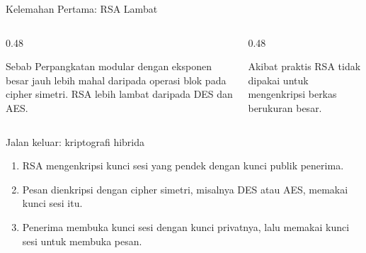 \documentclass[aspectratio=169,11pt]{beamer}
\begin{document}
\begin{frame}{Kelemahan Pertama: RSA Lambat}
    \footnotesize
    \begin{columns}[T,onlytextwidth]
        \begin{column}{0.48\textwidth}
            \begin{alertblock}{Sebab}
                Perpangkatan modular dengan eksponen besar jauh lebih mahal
                daripada operasi blok pada cipher simetri. RSA lebih lambat
                daripada DES dan AES.
            \end{alertblock}
        \end{column}
        \begin{column}{0.48\textwidth}
            \begin{exampleblock}{Akibat praktis}
                RSA tidak dipakai untuk mengenkripsi berkas berukuran
                besar.
            \end{exampleblock}
        \end{column}
    \end{columns}
    \vspace{0.15cm}
    \begin{block}{Jalan keluar: kriptografi hibrida}
        \footnotesize
        \begin{enumerate}
            \item RSA mengenkripsi kunci sesi yang pendek dengan kunci
                  publik penerima.
            \item Pesan dienkripsi dengan cipher simetri, misalnya DES atau
                  AES, memakai kunci sesi itu.
            \item Penerima membuka kunci sesi dengan kunci privatnya, lalu
                  memakai kunci sesi untuk membuka pesan.
        \end{enumerate}
    \end{block}
\end{frame}
\end{document}
